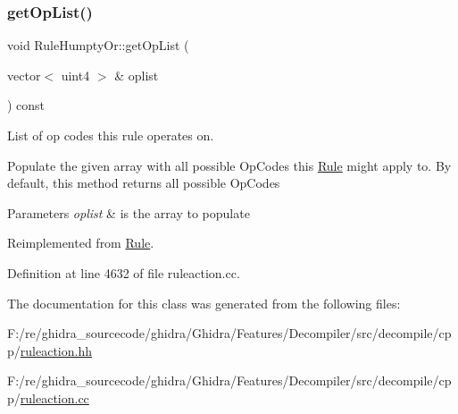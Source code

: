 \subsubsection{\texorpdfstring{getOpList()}{getOpList()}}
{\footnotesize\ttfamily void Rule\+Humpty\+Or\+::get\+Op\+List (\begin{DoxyParamCaption}\item[{vector$<$ uint4 $>$ \&}]{oplist }\end{DoxyParamCaption}) const\hspace{0.3cm}{\ttfamily [virtual]}}



List of op codes this rule operates on. 

Populate the given array with all possible Op\+Codes this \mbox{\hyperlink{class_rule}{Rule}} might apply to. By default, this method returns all possible Op\+Codes 
\begin{DoxyParams}{Parameters}
{\em oplist} & is the array to populate \\
\hline
\end{DoxyParams}


Reimplemented from \mbox{\hyperlink{class_rule_a4023bfc7825de0ab866790551856d10e}{Rule}}.



Definition at line 4632 of file ruleaction.\+cc.



The documentation for this class was generated from the following files\+:\begin{DoxyCompactItemize}
\item 
F\+:/re/ghidra\+\_\+sourcecode/ghidra/\+Ghidra/\+Features/\+Decompiler/src/decompile/cpp/\mbox{\hyperlink{ruleaction_8hh}{ruleaction.\+hh}}\item 
F\+:/re/ghidra\+\_\+sourcecode/ghidra/\+Ghidra/\+Features/\+Decompiler/src/decompile/cpp/\mbox{\hyperlink{ruleaction_8cc}{ruleaction.\+cc}}\end{DoxyCompactItemize}

